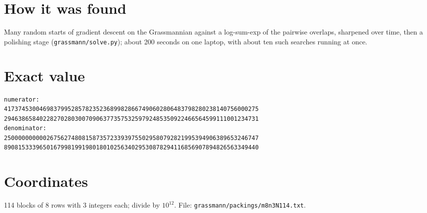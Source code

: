 \documentclass[11pt,a4paper]{article}
\begin{document}
\section{How it was found}
Many random starts of gradient descent on the Grassmannian against a log-sum-exp of the pairwise overlaps, sharpened over time, then a polishing stage (\texttt{grassmann/solve.py}); about 200 seconds on one laptop, with about ten such searches running at once.


\appendix
\section{Exact value}
{\small
\begin{verbatim}
numerator:
417374530046983799528578235236899828667490602806483798280238140756000275
294638658402282702803007090637735753259792485350922466564599111001234731
denominator:
250000000000267562748081587357233939755029580792821995394906389653246747
890815333965016799819919801801025634029530878294116856907894826563349440
\end{verbatim}}

\section{Coordinates}
114 blocks of 8 rows with 3 integers each; divide by $10^{12}$. File: \texttt{grassmann/packings/m8n3N114.txt}.
{\tiny
\begin{multicols}{3}
\end{multicols}}
\end{document}
